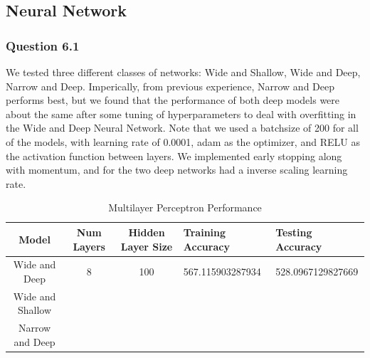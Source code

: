 \documentclass[11pt,letterpaper]{article}
\begin{document}
\subsection*{Neural Network}
\subsubsection*{Question 6.1}
We tested three different classes of networks: Wide and Shallow, Wide and Deep, 
Narrow and Deep. Imperically, from previous experience, Narrow and Deep performs 
best, but we found that the performance of both deep models were about the same after some 
tuning of hyperparameters to deal with overfitting in the Wide and Deep Neural 
Network. Note that we used a batchsize of 200 for all of the models, with 
learning rate of 0.0001, adam as the optimizer, and RELU as the activation 
function between layers. We implemented early stopping along with momentum, and 
for the two deep networks had a inverse scaling learning rate. 
\begin{table}[ht]
    \centering
        \label{table1} 
        \begin{tabular}{cccll} 
        \hline
        Model & Num Layers & Hidden Layer Size & Training Accuracy & Testing Accuracy \\
        \hline 
        Wide and Deep & 8 & 100 &567.115903287934 &528.0967129827669\\
        Wide and Shallow & \\
        Narrow and Deep & 
        \end{tabular}
        \caption{Multilayer Perceptron Performance}
        \end{table}
\end{document}
